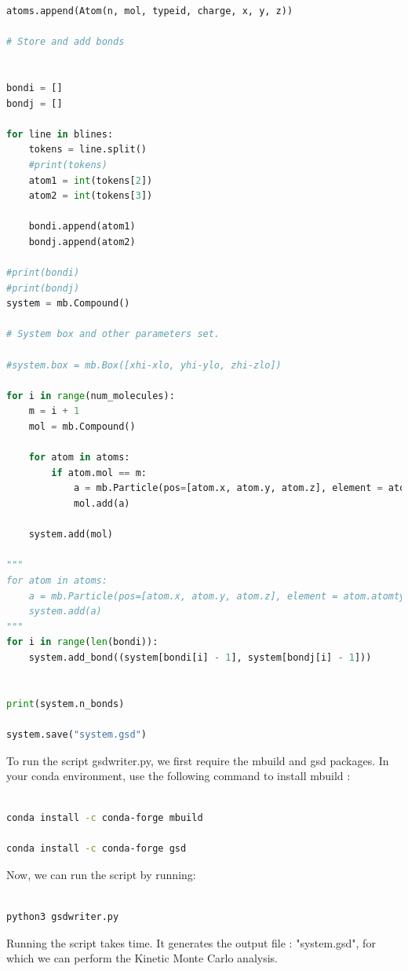 \documentclass{article}
\begin{document}
\begin{lstlisting}[language=python]
    atoms.append(Atom(n, mol, typeid, charge, x, y, z))

# Store and add bonds


bondi = []
bondj = []

for line in blines:
    tokens = line.split()
    #print(tokens)
    atom1 = int(tokens[2])
    atom2 = int(tokens[3])

    bondi.append(atom1)
    bondj.append(atom2)

#print(bondi)
#print(bondj)
system = mb.Compound()

# System box and other parameters set.

#system.box = mb.Box([xhi-xlo, yhi-ylo, zhi-zlo])

for i in range(num_molecules):
    m = i + 1
    mol = mb.Compound()

    for atom in atoms:
        if atom.mol == m:
            a = mb.Particle(pos=[atom.x, atom.y, atom.z], element = atom.atomtype, name=atom.atomtype, charge= atom.charge)
            mol.add(a)

    system.add(mol)

"""
for atom in atoms:
    a = mb.Particle(pos=[atom.x, atom.y, atom.z], element = atom.atomtype, name=atom.atomtype, charge= atom.charge)
    system.add(a)
"""
for i in range(len(bondi)):
    system.add_bond((system[bondi[i] - 1], system[bondj[i] - 1]))


print(system.n_bonds)

system.save("system.gsd")


\end{lstlisting}

To run the script gsdwriter.py, we first require the mbuild and gsd packages. In your conda environment, use the following command to install mbuild :

\begin{lstlisting}[language=bash]

conda install -c conda-forge mbuild

conda install -c conda-forge gsd

\end{lstlisting}

Now, we can run the script by running:

\begin{lstlisting}[language=bash]

python3 gsdwriter.py

\end{lstlisting}


Running the script takes time. It generates the output file : "system.gsd", for which we can perform the Kinetic Monte Carlo analysis.
\end{document}
